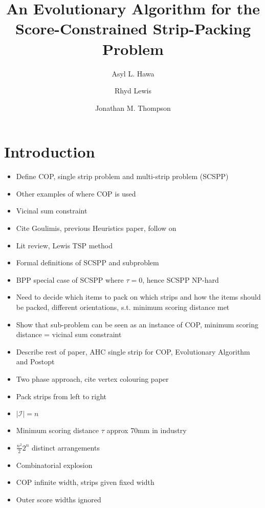 \documentclass{elsarticle}
\begin{document}
	
\begin{frontmatter}
\title{An Evolutionary Algorithm for the Score-Constrained Strip-Packing Problem}
\author{Asyl L. Hawa}
\author{Rhyd Lewis}
\author{Jonathan M. Thompson}
\address{School of Mathematics, Cardiff University, Senghennydd Road, Cardiff, UK}
\end{frontmatter}


\section{Introduction}
\begin{itemize}
	\item Define COP, single strip problem and multi-strip problem (SCSPP)
	\item Other examples of where COP is used
	\item Vicinal sum constraint
	\item Cite Goulimis, previous Heuristics paper, follow on
	\item Lit review, Lewis TSP method
	\item Formal definitions of SCSPP and subproblem
	\item BPP special case of SCSPP where $\tau = 0$, hence SCSPP NP-hard
	\item Need to decide which items to pack on which strips and how the items should be packed, different orientations, s.t. minimum scoring distance met
	\item Show that sub-problem can be seen as an instance of COP, minimum scoring distance = vicinal sum constraint
	\item Describe rest of paper, AHC single strip for COP, Evolutionary Algorithm and Postopt
	\item Two phase approach, cite vertex colouring paper
	\item Pack strips from left to right
	\item $|\mathcal{I}| = n$
	\item Minimum scoring distance $\tau$ approx 70mm in industry
	\item $\frac{n^2}{2} 2^n$ distinct arrangements
	\item Combinatorial explosion
	\item COP infinite width, strips given fixed width
	\item Outer score widths ignored
\end{itemize}
\end{document}
